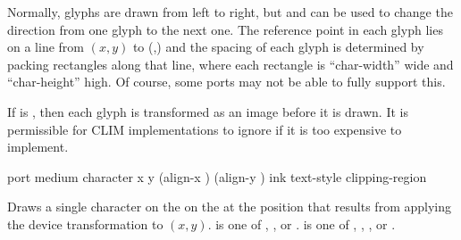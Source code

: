 Normally, glyphs are drawn from left to right, but  and
 can be used to change the direction from one glyph to the next
one.  The reference point in each glyph lies on a line from $(x,y)$ to
(,) and the spacing of each glyph is determined by
packing rectangles along that line, where each rectangle is ``char-width'' wide
and ``char-height'' high.  Of course, some ports may not be able to fully
support this.

If  is , then each glyph is transformed as an
image before it is drawn.  It is permissible for CLIM implementations to ignore
 if it is too expensive to implement.

 {port medium character x y
                                    (align-x ) (align-y )
                                    \optional ink text-style clipping-region}

Draws a single character on the   on the 
 at the position that results from applying the device transformation
to $(x,y)$.   is one of , , or .
 is one of , , , or
.
